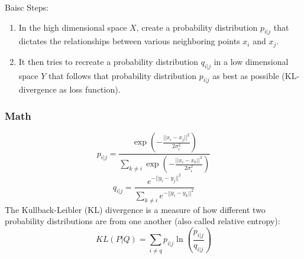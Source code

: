 Baisc Steps:
\begin{enumerate}
    \item In the high dimensional space \(X\), create a probability distribution \(p_{i|j}\) that dictates the relationships between various neighboring points \(x_i\) and \(x_j\).
    \item It then tries to recreate a probability distribution \(q_{i|j}\) in a low dimensional space \(Y\) that follows that probability distribution \(p_{i|j}\) as best as possible (KL-divergence as loss function).
\end{enumerate}

\subsubsection*{Math}
\[
p_{i|j} = \frac{\exp\left(-\frac{||x_i-x_j||^2}{2\sigma_i^2}\right)}{\sum_{k\neq i}\exp\left(-\frac{||x_i-x_k||^2}{2\sigma_i^2}\right)}
\]
\[
q_{i|j} = \frac{e^{-||y_i-y_j||^2}}{\sum_{k\neq i}e^{-||y_i-y_k||^2}}
\]
The Kullback-Leibler (KL) divergence is a measure of how different two probability distributions are from one another (also called relative entropy):
\[
KL(P|Q) = \sum_{i \neq q}p_{i|j} \ln(\frac{p_{i|j}}{q_{i|j}})
\]